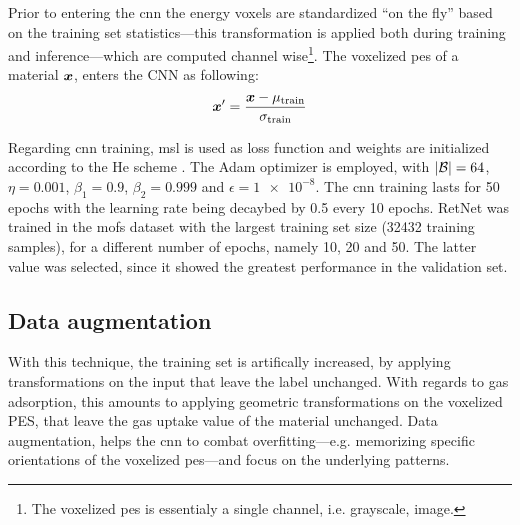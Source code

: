 Prior to entering the \gls{cnn} the energy voxels are standardized ``on the
fly'' based on the training set statistics---this transformation is applied both
during training and inference---which are computed channel wise\footnote{The
voxelized \gls{pes} is essentialy a single channel, i.e. grayscale,
image.}. The voxelized \gls{pes} of a material $\boldsymbol{x}$,
enters the CNN as following:
\begin{equation}
	\boldsymbol{x}' = \frac{\boldsymbol{x} - \mu_\text{train}}{\sigma_\text{train}}
\end{equation}

Regarding \gls{cnn} training, \gls{msl} is used as loss
function and weights are initialized according to the He scheme
\parencite{He2015}. The Adam optimizer \parencite{Kingma2017} is employed, with
$\lvert\mathcal{B}\rvert = \num{64}$, $\eta = \num{0.001}$, $\beta_1 = \num{0.9}$,
$\beta_2 = \num{0.999}$ and $\epsilon = \num{1e-8}$. The \gls{cnn} training lasts for
\num{50} epochs with the learning rate being decaybed by \num{0.5} every
\num{10} epochs. RetNet was trained in the \glspl{mof} dataset with
the largest training set size (\num{32432} training samples), for a different
number of epochs, namely \num{10}, \num{20} and \num{50}. The latter value was
selected, since it showed the greatest performance in the validation
set.

\subsection{Data augmentation}
\label{subsec:data_augmentation}

With this technique, the training set is artifically
increased, by applying transformations on the
input that leave the label unchanged. With regards to gas
adsorption, this amounts to applying geometric transformations on the voxelized
PES, that leave the gas uptake value of the material unchanged. Data
augmentation, helps the \gls{cnn} to combat
overfitting---e.g. memorizing specific orientations of the
voxelized \gls{pes}---and focus on the underlying patterns.

